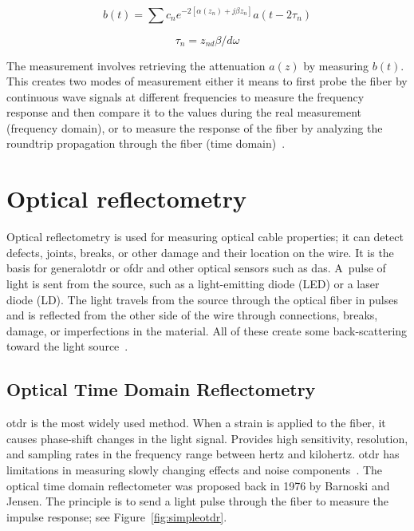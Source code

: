 \begin{equation}\label{complexenvelope}
    b(t) = \sum c_n e^{-2[\alpha(z_n)+j\beta z_n]} a(t-2\tau_n)
\end{equation}
     
\begin{equation}
    \tau_n = z_{nd} \beta / d\omega
\end{equation}

The measurement involves retrieving the attenuation \textit{$a(z)$} by measuring \textit{$b(t)$}. This creates two modes of measurement either it means to first probe the fiber by continuous wave signals at different frequencies to measure the frequency response and then compare it to the values during the real measurement (frequency domain), or to measure the response of the fiber by analyzing the roundtrip propagation through the fiber (time domain)~\cite{distributedrayleigh}.




\section{Optical reflectometry}\label{txt.reflectometry}

Optical reflectometry is used for measuring optical cable properties; it can detect defects, joints, breaks, or other damage and their location on the wire. It is the basis for \ac{generalotdr} or \ac{ofdr} and other optical sensors such as \ac{das}. A~pulse of light is sent from the source, such as a light-emitting diode (LED) or a laser diode (LD). The light travels from the source through the optical fiber in pulses and is reflected from the other side of the wire through connections, breaks, damage, or imperfections in the material. All of these create some back-scattering toward the light source~\cite{progress}. 






\subsection{Optical Time Domain Reflectometry}\label{txt.reflectometry.otdr}

\ac{otdr} is the most widely used method. When a strain is applied to the fiber, it causes phase-shift changes in the light signal. Provides high sensitivity, resolution, and sampling rates in the frequency range between hertz and kilohertz. \ac{otdr} has limitations in measuring slowly changing effects and noise components~\cite{distributedvibrsensingotdr}. The optical time domain reflectometer was proposed back in 1976 by Barnoski and Jensen. The principle is to send a light pulse through the fiber to measure the impulse response; see Figure~\ref{fig:simpleotdr}.

